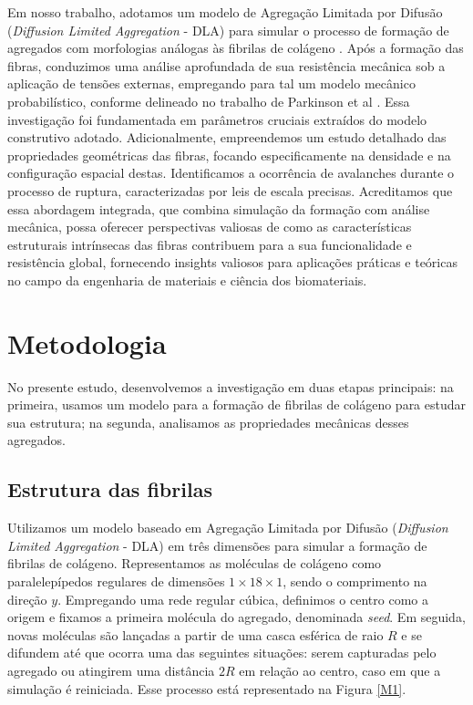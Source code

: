 \documentclass[11pt,a4paper]{article} %
\begin{document}
Em nosso trabalho, adotamos um modelo de Agregação Limitada por Difusão (\textit{Diffusion Limited Aggregation} - DLA) para simular  
o processo de formação de agregados com morfologias análogas às fibrilas de colágeno \cite{Parkinson1995}. Após a formação das fibras,  
conduzimos uma análise aprofundada de sua resistência mecânica sob a aplicação de tensões externas, empregando para tal um modelo mecânico  
probabilístico, conforme delineado no trabalho de Parkinson et al \cite{Parkinson1997}. Essa investigação foi fundamentada em parâmetros  
cruciais extraídos do modelo construtivo adotado. Adicionalmente, empreendemos um estudo detalhado das propriedades geométricas das fibras,  
focando especificamente na densidade e na configuração espacial destas. Identificamos a ocorrência de avalanches durante o processo de ruptura,  
caracterizadas por leis de escala precisas. Acreditamos que essa abordagem integrada, que combina simulação da formação com análise mecânica, possa  
oferecer perspectivas valiosas de como as características estruturais intrínsecas das fibras contribuem para a sua funcionalidade e resistência  
global, fornecendo insights valiosos para aplicações práticas e teóricas no campo da engenharia de materiais e ciência dos biomateriais. 



\section{Metodologia}

No presente estudo, desenvolvemos a investigação em duas etapas principais: na primeira, usamos um modelo para a formação de  
fibrilas de colágeno para estudar sua estrutura; na segunda, analisamos as propriedades mecânicas desses agregados.  


\subsection{Estrutura das fibrilas} 



Utilizamos um modelo baseado em Agregação Limitada por Difusão (\textit{Diffusion Limited Aggregation} - DLA) \cite{Witten1983}  
em três dimensões para simular a formação de fibrilas de colágeno. Representamos as moléculas de colágeno como paralelepípedos  
regulares de dimensões \(1 \times 18 \times 1\), sendo o comprimento na direção \(y\). Empregando uma rede regular cúbica,  
definimos o centro como a origem e fixamos a primeira molécula do agregado, denominada \textit{seed}. Em seguida, novas moléculas 
são lançadas a partir de uma casca esférica de raio \(R\) e se difundem até que ocorra uma das seguintes situações: serem capturadas 
pelo agregado ou atingirem uma distância \(2R\) em relação ao centro, caso em que a simulação é reiniciada. Esse processo está representado na Figura \ref{M1}.  
\end{document}
